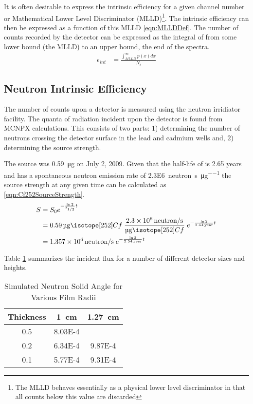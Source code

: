 \documentclass[draftcls,onecolumn]{IEEEtran}
\begin{document}
It is often desirable to express the intrinsic efficiency for a given channel number or Mathematical Lower Level Discriminator (MLLD)\footnote{The MLLD behaves essentially as a physical lower level discriminator in that all counts below this value are discarded}.
The intrinsic efficiency can then be expressed as a function of this MLLD \eqref{eqn:MLLDDef}.
The number of counts recorded by the detector can be expressed as the integral of  from some lower bound (the MLLD) to an upper bound, the end of the spectra.
\begin{align}
	\label{eqn:MLLDDef}
	\epsilon_{int} &= \frac{\int_{MLLD}^\infty p(x)dx}{N_i}
\end{align}

\subsection{Neutron Intrinsic Efficiency}
The number of counts upon a detector is measured using the neutron irridiator facility.
The quanta of radiation incident upon the detector is found from MCNPX calculations.
This consists of two parts: 1) determining the number of neutrons crossing the detector surface in the lead and cadmium wells and, 2) determining the source strength.

The  source was \SI{0.59}{\ug} on July 2, 2009.
Given that the half-life of  is 2.65 years and  has a spontaneous neutron emission rate of \SI{2.3E6}{neutron\per\second\per\micro\gram} the source strength at any given time can be calculated as \eqref{eqn:Cf252SourceStrength}.
\begin{align}
  \label{eqn:Cf252SourceStrength}
  S &= S_0 e^{-\frac{\ln{2}}{t_{1/2}} t} \\ \notag 
    &= \SI{0.59}{\ug} \iso[252]{Cf} \;\frac{\SI{2.3E6}{neutron\per\second}}{\si{\ug} \iso[252]{Cf}}\; e^{-\frac{ \ln{2}}{\SI{2.54}{year}}t}  \\ \notag
    &= \SI{1.357E6}{neutron\per\second}\; e^{-\frac{ \ln{2}}{\SI{2.54}{year}}t} 
\end{align}

Table \ref{tab:NeutronSolidAngle} summarizes the incident flux for a number of different detector sizes and heights.

\begin{table}
	\centering
	\caption{Simulated Neutron Solid Angle for Various Film Radii}
	\label{tab:NeutronSolidAngle}
	\begin{tabular}{c | c c}
 		Thickness & \SI{1}{\cm} & \SI{1.27}{\cm}  \\ \hline
		0.5 & \num{8.03E-4} & \\
		0.2 & \num{6.34E-4} & \num{9.87E-4} \\
		0.1 & \num{5.77E-4} & \num{9.31E-4} \\ 
	\end{tabular}
\end{table}
\end{document}
